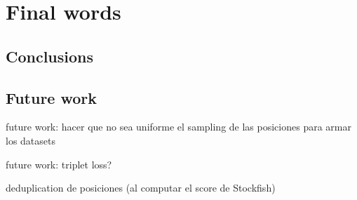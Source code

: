 \section{Final words}
\subsection{Conclusions}
\subsection{Future work}




future work: hacer que no sea uniforme el sampling de las posiciones para armar los datasets

future work: triplet loss?

deduplication de posiciones (al computar el score de Stockfish)

